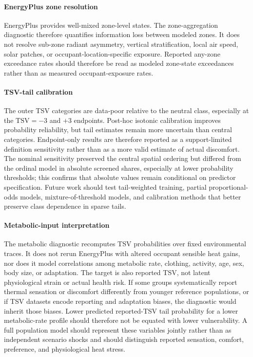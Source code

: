 \paragraph{EnergyPlus zone resolution}
EnergyPlus provides well-mixed zone-level states. The zone-aggregation diagnostic therefore quantifies information loss between modeled zones. It does not resolve sub-zone radiant asymmetry, vertical stratification, local air speed, solar patches, or occupant-location-specific exposure. Reported any-zone exceedance rates should therefore be read as modeled zone-state exceedances rather than as measured occupant-exposure rates.

\paragraph{TSV-tail calibration}
The outer TSV categories are data-poor relative to the neutral class, especially at the $\mathrm{TSV}=-3$ and $+3$ endpoints. Post-hoc isotonic calibration improves probability reliability, but tail estimates remain more uncertain than central categories. Endpoint-only results are therefore reported as a support-limited definition sensitivity rather than as a more valid estimate of actual discomfort. The nominal sensitivity preserved the central spatial ordering but differed from the ordinal model in absolute screened shares, especially at lower probability thresholds; this confirms that absolute values remain conditional on predictor specification. Future work should test tail-weighted training, partial proportional-odds models, mixture-of-threshold models, and calibration methods that better preserve class dependence in sparse tails.

\paragraph{Metabolic-input interpretation}
The metabolic diagnostic recomputes TSV probabilities over fixed environmental traces. It does not rerun EnergyPlus with altered occupant sensible heat gains, nor does it model correlations among metabolic rate, clothing, activity, age, sex, body size, or adaptation. The target is also reported TSV, not latent physiological strain or actual health risk. If some groups systematically report thermal sensation or discomfort differently from younger reference populations, or if TSV datasets encode reporting and adaptation biases, the diagnostic would inherit those biases. Lower predicted reported-TSV tail probability for a lower metabolic-rate profile should therefore not be equated with lower vulnerability. A full population model should represent these variables jointly rather than as independent scenario shocks and should distinguish reported sensation, comfort, preference, and physiological heat stress.

